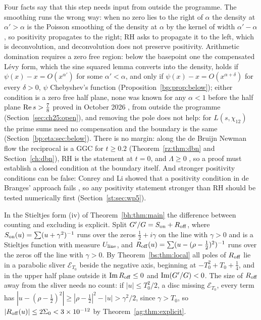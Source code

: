 Four facts say that this step needs input from outside the programme. The smoothing runs the wrong way: when no zero lies to the right of $\alpha$ the density at $\alpha'>\alpha$ is the Poisson smoothing of the density at $\alpha$ by the kernel of width $\alpha'-\alpha$, so positivity propagates to the right; RH asks to propagate it to the left, which is deconvolution, and deconvolution does not preserve positivity. Arithmetic domination requires a zero free region: below the basepoint one the compensated L\'evy form, which the sine squared lemma converts into the density, holds if $\psi(x)-x=O(x^{\alpha'})$ for some $\alpha'<\alpha$, and only if $\psi(x)-x=O(x^{\alpha+\delta})$ for every $\delta>0$, $\psi$ Chebyshev's function (Proposition~\ref{bp:prop:below}); either condition is a zero free half plane, none was known for any $\alpha<1$ before the half plane $\operatorname{Re} s>\frac78$ proved in October 2026 \cite{OAI26a}, from outside the programme (Section~\ref{sec:ch25:open}), and removing the pole does not help: for $L(s,\chi_{12})$ the prime sums need no compensation and the boundary is the same (Section~\ref{bp:eta:sec:below}). There is no margin: along the de Bruijn Newman flow the reciprocal is a GGC for $t\ge0.2$ \cite{PT21} (Theorem~\ref{rz:thm:dbn} and Section~\ref{ch:dbn}), RH is the statement at $t=0$, and $\Lambda\ge0$ \cite{RodgersTao}, so a proof must establish a closed condition at the boundary itself. And stronger positivity conditions can be false: Conrey and Li showed that a positivity condition in de Branges' approach fails \cite{CL00}, so any positivity statement stronger than RH should be tested numerically first (Section~\ref{st:sec:wp5}).

In the Stieltjes form (iv) of Theorem~\ref{bh:thm:main} the difference between counting and excluding is explicit. Split $G'/G=S_{\rm on}+R_{\rm off}$, where $S_{\rm on}(u)=\sum(u+\gamma^2)^{-1}$ runs over the zeros $\frac12+i\gamma$ on the line with $\gamma>0$ and is a Stieltjes function with measure $U_{\rm line}$, and $R_{\rm off}(u)=\sum(u-(\rho-\frac12)^2)^{-1}$ runs over the zeros off the line with $\gamma>0$. By Theorem~\ref{bs:thm:local} all poles of $R_{\rm off}$ lie in a parabolic sliver $\mathcal E_{T_0}$ beside the negative axis, beginning at $-T_0^2+T_0+\frac14$, and in the upper half plane outside it $\operatorname{Im} R_{\rm off}\le0$ and $\operatorname{Im}(G'/G)<0$. The size of $R_{\rm off}$ away from the sliver needs no count: if $|u|\le T_0^2/2$, a disc missing $\mathcal E_{T_0}$, every term has $|u-(\rho-\frac12)^2|\ge|\rho-\frac12|^2-|u|>\gamma^2/2$, since $\gamma>T_0$, so $|R_{\rm off}(u)|\le2\Sigma_0<3\times10^{-12}$ by Theorem~\ref{ag:thm:explicit}.

